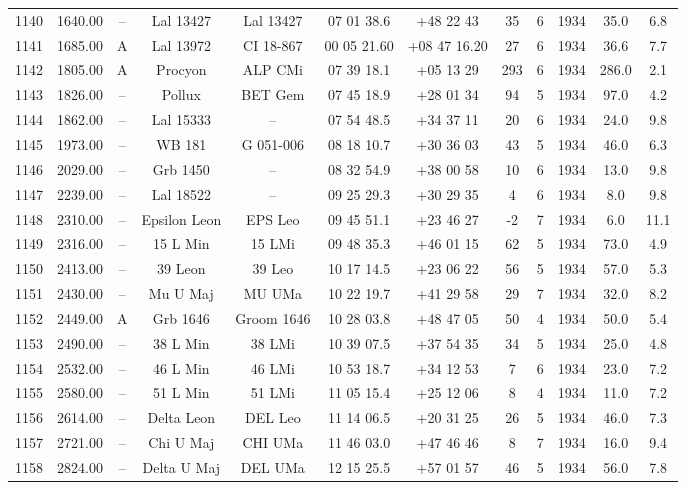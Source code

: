 \begin{table}
\begin{tabular}{cccccccccccc}
1140 & 1640.00 & -- & Lal 13427 & Lal 13427 & 07 01 38.6 & +48 22 43 & 35 & 6 & 1934 & 35.0 & 6.8 \\
1141 & 1685.00 & A & Lal 13972 & CI 18-867 & 00 05 21.60 & +08 47 16.20 & 27 & 6 & 1934 & 36.6 & 7.7 \\
1142 & 1805.00 & A & Procyon & ALP CMi & 07 39 18.1 & +05 13 29 & 293 & 6 & 1934 & 286.0 & 2.1 \\
1143 & 1826.00 & -- & Pollux & BET Gem & 07 45 18.9 & +28 01 34 & 94 & 5 & 1934 & 97.0 & 4.2 \\
1144 & 1862.00 & -- & Lal 15333 & -- & 07 54 48.5 & +34 37 11 & 20 & 6 & 1934 & 24.0 & 9.8 \\
1145 & 1973.00 & -- & WB 181 & G 051-006 & 08 18 10.7 & +30 36 03 & 43 & 5 & 1934 & 46.0 & 6.3 \\
1146 & 2029.00 & -- & Grb 1450 & -- & 08 32 54.9 & +38 00 58 & 10 & 6 & 1934 & 13.0 & 9.8 \\
1147 & 2239.00 & -- & Lal 18522 & -- & 09 25 29.3 & +30 29 35 & 4 & 6 & 1934 & 8.0 & 9.8 \\
1148 & 2310.00 & -- & Epsilon Leon & EPS Leo & 09 45 51.1 & +23 46 27 & -2 & 7 & 1934 & 6.0 & 11.1 \\
1149 & 2316.00 & -- & 15 L Min & 15 LMi & 09 48 35.3 & +46 01 15 & 62 & 5 & 1934 & 73.0 & 4.9 \\
1150 & 2413.00 & -- & 39 Leon & 39 Leo & 10 17 14.5 & +23 06 22 & 56 & 5 & 1934 & 57.0 & 5.3 \\
1151 & 2430.00 & -- & Mu U Maj & MU UMa & 10 22 19.7 & +41 29 58 & 29 & 7 & 1934 & 32.0 & 8.2 \\
1152 & 2449.00 & A & Grb 1646 & Groom 1646 & 10 28 03.8 & +48 47 05 & 50 & 4 & 1934 & 50.0 & 5.4 \\
1153 & 2490.00 & -- & 38 L Min & 38 LMi & 10 39 07.5 & +37 54 35 & 34 & 5 & 1934 & 25.0 & 4.8 \\
1154 & 2532.00 & -- & 46 L Min & 46 LMi & 10 53 18.7 & +34 12 53 & 7 & 6 & 1934 & 23.0 & 7.2 \\
1155 & 2580.00 & -- & 51 L Min & 51 LMi & 11 05 15.4 & +25 12 06 & 8 & 4 & 1934 & 11.0 & 7.2 \\
1156 & 2614.00 & -- & Delta Leon & DEL Leo & 11 14 06.5 & +20 31 25 & 26 & 5 & 1934 & 46.0 & 7.3 \\
1157 & 2721.00 & -- & Chi U Maj & CHI UMa & 11 46 03.0 & +47 46 46 & 8 & 7 & 1934 & 16.0 & 9.4 \\
1158 & 2824.00 & -- & Delta U Maj & DEL UMa & 12 15 25.5 & +57 01 57 & 46 & 5 & 1934 & 56.0 & 7.8 \\

\end{tabular}
\end{table}

